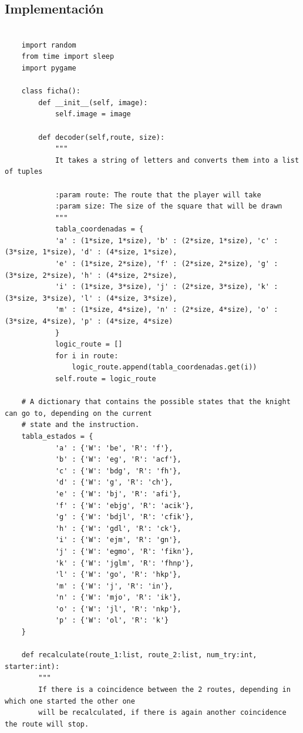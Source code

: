 \documentclass{article}
\begin{document}
\subsection*{Implementaci\'on}
\begin{lstlisting}

    import random
    from time import sleep
    import pygame
    
    class ficha():
        def __init__(self, image):
            self.image = image
        
        def decoder(self,route, size):
            """
            It takes a string of letters and converts them into a list of tuples
            
            :param route: The route that the player will take
            :param size: The size of the square that will be drawn
            """
            tabla_coordenadas = {
            'a' : (1*size, 1*size), 'b' : (2*size, 1*size), 'c' : (3*size, 1*size), 'd' : (4*size, 1*size),
            'e' : (1*size, 2*size), 'f' : (2*size, 2*size), 'g' : (3*size, 2*size), 'h' : (4*size, 2*size),
            'i' : (1*size, 3*size), 'j' : (2*size, 3*size), 'k' : (3*size, 3*size), 'l' : (4*size, 3*size),
            'm' : (1*size, 4*size), 'n' : (2*size, 4*size), 'o' : (3*size, 4*size), 'p' : (4*size, 4*size)
            }
            logic_route = []
            for i in route:
                logic_route.append(tabla_coordenadas.get(i))
            self.route = logic_route
    
    # A dictionary that contains the possible states that the knight can go to, depending on the current
    # state and the instruction.
    tabla_estados = {
            'a' : {'W': 'be', 'R': 'f'},
            'b' : {'W': 'eg', 'R': 'acf'},
            'c' : {'W': 'bdg', 'R': 'fh'},
            'd' : {'W': 'g', 'R': 'ch'},
            'e' : {'W': 'bj', 'R': 'afi'},
            'f' : {'W': 'ebjg', 'R': 'acik'},
            'g' : {'W': 'bdjl', 'R': 'cfik'},
            'h' : {'W': 'gdl', 'R': 'ck'},
            'i' : {'W': 'ejm', 'R': 'gn'},
            'j' : {'W': 'egmo', 'R': 'fikn'},
            'k' : {'W': 'jglm', 'R': 'fhnp'},
            'l' : {'W': 'go', 'R': 'hkp'},
            'm' : {'W': 'j', 'R': 'in'},
            'n' : {'W': 'mjo', 'R': 'ik'},
            'o' : {'W': 'jl', 'R': 'nkp'},
            'p' : {'W': 'ol', 'R': 'k'}
    }
    
    def recalculate(route_1:list, route_2:list, num_try:int, starter:int):
        """
        If there is a coincidence between the 2 routes, depending in which one started the other one
        will be recalculated, if there is again another coincidence the route will stop.
        

\end{lstlisting}
\end{document}
